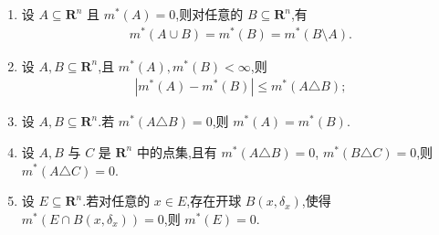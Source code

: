 \documentclass[../../main.tex]{subfiles}%
\begin{document}
\begin{proposition}
\begin{enumerate}[(1)]
\item 设 $A\subseteq\mathbf{R}^n$ 且 $m^*(A)=0$,则对任意的 $B\subseteq\mathbf{R}^n$,有
\begin{align*}
m^*(A\cup B)=m^*(B)=m^*(B\setminus A).
\end{align*}
\item 设 $A,B\subseteq\mathbf{R}^n$,且 $m^*(A),m^*(B)<\infty$,则
\begin{align*}
|m^*(A)-m^*(B)|\leqslant m^*(A\triangle B);
\end{align*}
\item 设 $A,B\subseteq\mathbf{R}^n$.若 $m^*(A\triangle B)=0$,则 $m^*(A)=m^*(B)$.
\item 设 $A,B$ 与 $C$ 是 $\mathbf{R}^n$ 中的点集,且有 $m^*(A\triangle B)=0$, $m^*(B\triangle C)=0$,则 $m^*(A\triangle C)=0$.
\item 设 $E\subseteq\mathbf{R}^n$.若对任意的 $x\in E$,存在开球 $B(x,\delta_x)$,使得 $m^*(E\cap B(x,\delta_x))=0$,则 $m^*(E)=0$.
\end{enumerate}
\end{proposition}
\end{document}
